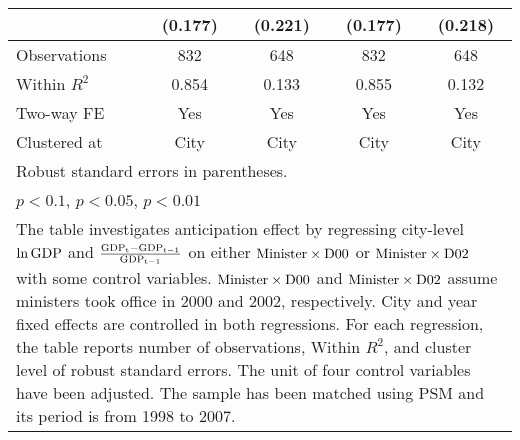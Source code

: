 \documentclass[11pt,a4paper]{article}
\begin{document}
\begin{center}
\begin{scriptsize}
{\begin{tabular}{l*{4}{c}}
            &     (0.177)         &     (0.221)         &     (0.177)         &     (0.218)         \\            
\hline
Observations      &         832         &      648        &     832       &         648         \\
Within $R^{2}$       &       0.854         &          0.133     &        0.855         &       0.132         \\
Two-way FE    &   Yes    &     Yes      &      Yes        &   Yes       \\
Clustered at  &        City         &        City        &      City         &      City         \\
\hline\hline
\multicolumn{5}{l}{\footnotesize Robust standard errors in parentheses.}\\
\multicolumn{5}{l}{\footnotesize \sym{*} \(p<0.1\), \sym{**} \(p<0.05\), \sym{***} \(p<0.01\)}\\
\multicolumn{5}{p{10.3cm}}{\footnotesize The table investigates anticipation effect by regressing city-level \(\rm \ln GDP\) and $\rm \frac{ GDP_{t}-GDP_{t-1}}{GDP_{t-1}}$ on either ${\rm Minister \times D00}$ or ${\rm Minister \times D02}$ with some control variables. ${\rm Minister \times D00}$ and ${\rm Minister \times D02}$ assume ministers took office in 2000 and 2002, respectively. City and year fixed effects are controlled in both regressions. For each regression, the table reports number of observations, Within $R^{2}$, and cluster level of robust standard errors. The unit of four control variables have been adjusted. The sample has been matched using PSM and its period is from 1998 to 2007. }\\
\end{tabular}
}


\end{scriptsize}
\end{center}


\newpage
\end{document}
